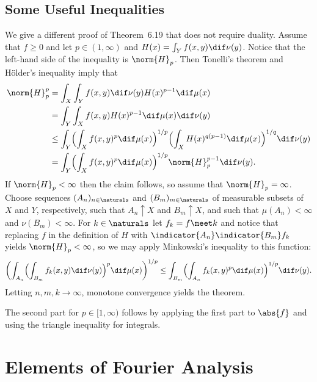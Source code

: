 \documentclass[article, a4paper, 11pt, oneside]{memoir}
\numberwithin{equation}{chapter}
\theoremstyle{nonumberplain}
\begin{document}
\addtocounter{section}{1}
\section{Some Useful Inequalities}

\begin{remarkbreak}
	We give a different proof of Theorem~6.19 that does not require duality. Assume that $f \geq 0$ and let $p \in (1,\infty)$ and $H(x) = \int_Y f(x,y) \dif\nu(y)$. Notice that the left-hand side of the inequality is $\norm{H}_p$. Then Tonelli's theorem and Hölder's inequality imply that
	\begin{align*}
		\norm{H}_p^p
			&= \int_X \int_Y f(x,y) \dif\nu(y) H(x)^{p-1} \dif\mu(x) \\
			&= \int_Y \int_X f(x,y) H(x)^{p-1} \dif\mu(x) \dif\nu(y) \\
			&\leq \int_Y \Bigl( \int_X f(x,y)^p \dif\mu(x) \Bigr)^{1/p} \Bigl( \int_X H(x)^{q(p-1)} \dif\mu(x) \Bigr)^{1/q} \dif\nu(y) \\
			&= \int_Y \Bigl( \int_X f(x,y)^p \dif\mu(x) \Bigr)^{1/p} \norm{H}_p^{p-1} \dif\nu(y).
	\end{align*}
	If $\norm{H}_p < \infty$ then the claim follows, so assume that $\norm{H}_p = \infty$. Choose sequences $(A_n)_{n \in \naturals}$ and $(B_m)_{m \in \naturals}$ of measurable subsets of $X$ and $Y$, respectively, such that $A_n \uparrow X$ and $B_m \uparrow X$, and such that $\mu(A_n) < \infty$ and $\nu(B_m) < \infty$. For $k \in \naturals$ let $f_k = f \meet k$ and notice that replacing $f$ in the definition of $H$ with $\indicator{A_n} \indicator{B_m} f_k$ yields $\norm{H}_p < \infty$, so we may apply Minkowski's inequality to this function:
	\begin{equation*}
		\biggl( \int_{A_n} \Bigl( \int_{B_m} f_k(x,y) \dif\nu(y) \Bigr)^p \dif\mu(x) \biggr)^{1/p}
			\leq \int_{B_m} \Bigl( \int_{A_n} f_k(x,y)^p \dif\mu(x) \Bigr)^{1/p} \dif\nu(y).
	\end{equation*}
	Letting $n,m,k \to \infty$, monotone convergence yields the theorem.

	The second part for $p \in [1,\infty)$ follows by applying the first part to $\abs{f}$ and using the triangle inequality for integrals.
\end{remarkbreak}



\addtocounter{chapter}{1}
\chapter{Elements of Fourier Analysis}
\end{document}
